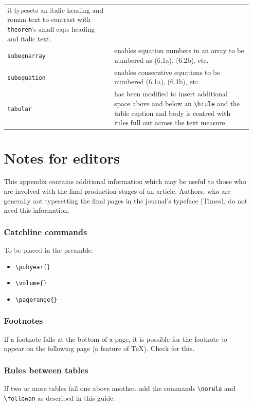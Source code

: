 \begin{tabular}{lp{8cm}}
                          it typesets an italic heading and roman text to
                          contrast with \verb"theorem"'s small caps heading
                          and italic text.\\
\verb"subeqnarray"      & enables equation numbers in an array to be 
                          numbered as (6.1a), (6.2b), etc.\\
\verb"subequation"      & enables consecutive equations to be numbered
                          (6.1a), (6.1b), etc.\\
\verb"tabular"          & has been modified to insert additional space above  
                          and below an \verb"\hrule" and the table caption
                          and body is centred with rules full out across the
                          text measure.
\end{tabular}

\newpage

\section{Notes for editors}
\setcounter{subsubsection}{0}

This appendix contains additional information which may be useful to
those who are involved with the final production stages of an article.
Authors, who are generally not typesetting the final pages in the
journal's typeface (Times), do not need this information.

\subsubsection{Catchline commands}
To be placed in the preamble:
\begin{itemize}
  \item \verb"\pubyear{}"
  \item \verb"\volume{}"
  \item \verb"\pagerange{}"
\end{itemize}

\subsubsection{Footnotes}
If a footnote falls at the bottom of a page, it is possible for the
footnote to appear on the following page (a feature of \TeX ). Check
for this.

\subsubsection{Rules between tables}
If two or more tables fall one above another, add the commands 
\verb"\norule" and \verb"\followon" as described in this guide.

